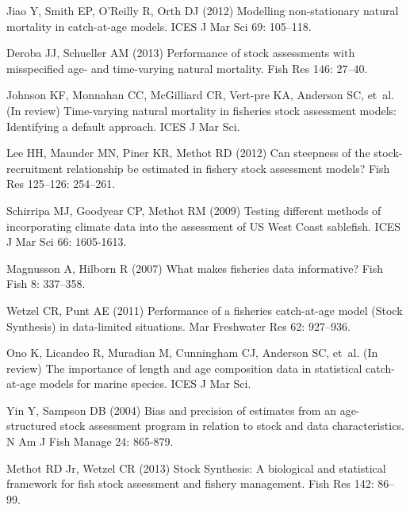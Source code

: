 \documentclass[12pt]{article}
\begin{document}
\begin{thebibliography}{10}
Jiao Y, Smith EP, O'Reilly R, Orth DJ (2012) Modelling non-stationary natural
  mortality in catch-at-age models.
\newblock ICES J Mar Sci 69: 105--118.

Deroba JJ, Schueller AM (2013) Performance of stock assessments with
  misspecified age- and time-varying natural mortality.
\newblock Fish Res 146: 27--40.

Johnson KF, Monnahan CC, McGilliard CR, Vert-pre KA, Anderson SC, et~al. (In review)
  Time-varying natural mortality in fisheries stock assessment models:
  Identifying a default approach.
\newblock ICES J Mar Sci.

Lee HH, Maunder MN, Piner KR, Methot RD (2012) Can steepness of the
  stock-recruitment relationship be estimated in fishery stock assessment
  models?
\newblock Fish Res 125--126: 254--261.

Schirripa MJ, Goodyear CP, Methot RM (2009) Testing different methods of
  incorporating climate data into the assessment of {US West Coast} sablefish.
\newblock ICES J Mar Sci 66: 1605-1613.

Magnusson A, Hilborn R (2007) What makes fisheries data informative?
\newblock Fish Fish 8: 337--358.

Wetzel CR, Punt AE (2011) Performance of a fisheries catch-at-age model ({Stock
  Synthesis}) in data-limited situations.
\newblock Mar Freshwater Res 62: 927--936.

Ono K, Licandeo R, Muradian M, Cunningham CJ, Anderson SC, et~al. (In review) The
  importance of length and age composition data in statistical catch-at-age
  models for marine species.
\newblock ICES J Mar Sci.

Yin Y, Sampson DB (2004) Bias and precision of estimates from an age-structured
  stock assessment program in relation to stock and data characteristics.
\newblock N Am J Fish Manage 24: 865-879.

Methot RD Jr, Wetzel CR (2013) {Stock Synthesis}: A biological and statistical
  framework for fish stock assessment and fishery management.
\newblock Fish Res 142: 86--99.


\end{thebibliography}
\end{document}
